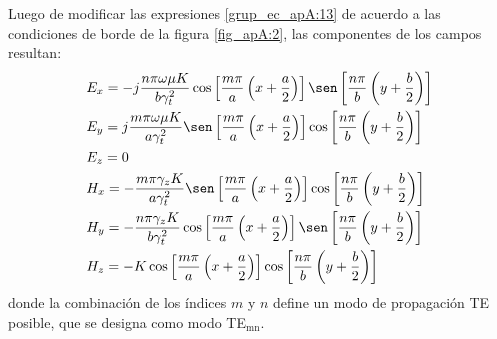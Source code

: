 Luego de modificar las expresiones \eqref{grup_ec_apA:13} de acuerdo a las condiciones de borde de la figura \ref{fig_apA:2}, las componentes de los campos resultan:
\begin{subequations}
\label{grup_ec_apA:14}
\begin{align}
&E_x = -j\frac{n\pi\omega\mu K}{b\gamma_t^2}\cos\left[\frac{m\pi}{a}\left(x + \frac{a}{2}\right)\right]\sen\left[\frac{n\pi}{b}\left(y + \frac{b}{2}\right)\right]
\label{ec_apA:57}\\
&E_y = j\frac{m\pi\omega\mu K}{a\gamma_t^2}\sen\left[\frac{m\pi}{a}\left(x + \frac{a}{2}\right)\right]\cos\left[\frac{n\pi}{b}\left(y + \frac{b}{2}\right)\right]
\label{ec_apA:58}\\
&E_z = 0
\label{ec_apA:59}\\
&H_x = -\frac{m\pi\gamma_zK}{a\gamma_t^2}\sen\left[\frac{m\pi}{a}\left(x + \frac{a}{2}\right)\right]\cos\left[\frac{n\pi}{b}\left(y + \frac{b}{2}\right)\right]
\label{ec_apA:60}\\
&H_y = -\frac{n\pi\gamma_zK}{b\gamma_t^2}\cos\left[\frac{m\pi}{a}\left(x + \frac{a}{2}\right)\right]\sen\left[\frac{n\pi}{b}\left(y + \frac{b}{2}\right)\right]
\label{ec_apA:61}\\
&H_z = -K\cos\left[\frac{m\pi}{a}\left(x + \frac{a}{2}\right)\right]\cos\left[\frac{n\pi}{b}\left(y + \frac{b}{2}\right)\right]
\label{ec_apA:62}
\end{align}
\end{subequations}
donde la combinación de los índices $m$ y $n$ define un modo de propagación TE posible, que se designa como modo TE$_{\text{mn}}$.


